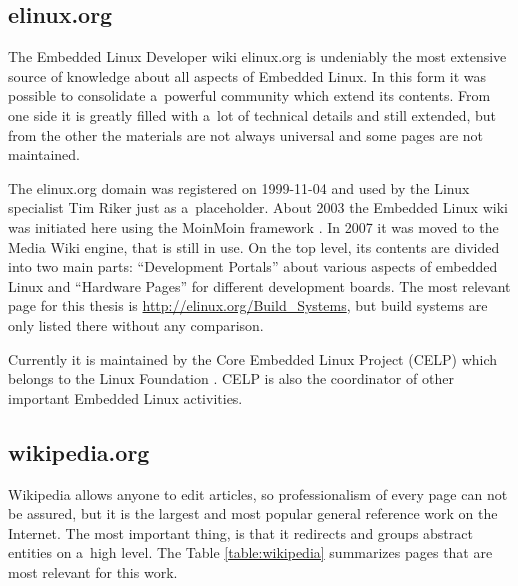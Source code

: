 \documentclass[printmode]{mgr}
\begin{document}
\subsection*{elinux.org}

The Embedded Linux Developer wiki elinux.org is undeniably the most extensive source of knowledge about all aspects of Embedded Linux.
In this form it was possible to consolidate a~powerful community which extend its contents.
From one side it is greatly filled with a~lot of technical details and still extended, but from the other the materials are not always universal and some pages are not maintained.

The elinux.org domain was registered on 1999-11-04 \cite{web:whois-elinux} and used by the Linux specialist Tim Riker just as a~placeholder.\cite{web:riker}\cite{web:elinux-placeholder}
About 2003 the Embedded Linux wiki was initiated here using the MoinMoin framework \cite{web:elinux-moinmoin}.
In 2007 it was moved to the Media Wiki engine, that is still in use.
On the top level, its contents are divided into two main parts: ``Development Portals'' about various aspects of embedded Linux and ``Hardware Pages'' for different development boards.
The most relevant page for this thesis is \url{http://elinux.org/Build_Systems}, but build systems are only listed there without any comparison.

Currently it is maintained by the Core Embedded Linux Project (CELP) which belongs to the Linux Foundation \cite{web:linuxfoundation-celp}.
CELP is also the coordinator of other important Embedded Linux activities.

\subsection*{wikipedia.org}

Wikipedia allows anyone to edit articles, so professionalism of every page can not be assured, but it is the largest and most popular general reference work on the Internet.
The most important thing, is that it redirects and groups abstract entities on a~high level.
The Table \ref{table:wikipedia} summarizes pages that are most relevant for this work.
\end{document}
